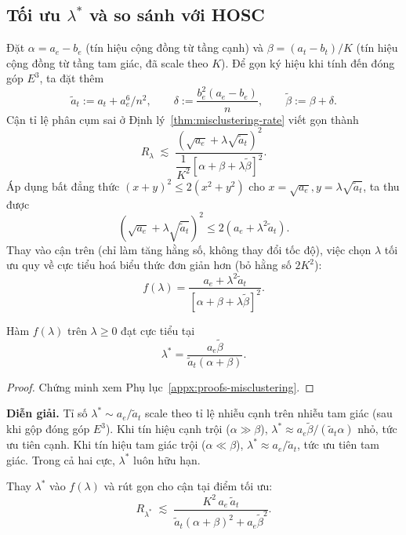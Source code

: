 \subsection{Tối ưu $\lambda^*$ và so sánh với HOSC}
\label{subsec:lambda-opt}

Đặt $\alpha = a_e - b_e$ (tín hiệu cộng đồng từ tầng cạnh) và $\beta = (a_t - b_t)/K$ (tín hiệu cộng đồng từ tầng tam giác, đã scale theo $K$). Để gọn ký hiệu khi tính đến đóng góp $E^3$, ta đặt thêm
\[
    \tilde a_t := a_t + a_e^6/n^2, \qquad \delta := \frac{b_e^2 (a_e - b_e)}{n}, \qquad \tilde\beta := \beta + \delta.
\]
Cận tỉ lệ phân cụm sai ở Định lý~\ref{thm:misclustering-rate} viết gọn thành
\[
    R_\lambda \;\lesssim\; \frac{(\sqrt{a_e} + \lambda \sqrt{\tilde a_t})^2}{\dfrac{1}{K^2}\left[\alpha + \beta + \lambda \tilde\beta\right]^2}.
\]
Áp dụng bất đẳng thức $(x + y)^2 \leq 2(x^2 + y^2)$ cho $x = \sqrt{a_e}, y = \lambda \sqrt{\tilde a_t}$, ta thu được
\[
    (\sqrt{a_e} + \lambda \sqrt{\tilde a_t})^2 \leq 2 (a_e + \lambda^2 \tilde a_t).
\]
Thay vào cận trên (chỉ làm tăng hằng số, không thay đổi tốc độ), việc chọn $\lambda$ tối ưu quy về cực tiểu hoá biểu thức đơn giản hơn (bỏ hằng số $2 K^2$):
\[
    f(\lambda) = \frac{a_e + \lambda^2 \tilde a_t}{\left[\alpha + \beta + \lambda \tilde\beta\right]^2}.
\]

\begin{proposition}
\label{prop:lambda-opt}
Hàm $f(\lambda)$ trên $\lambda \geq 0$ đạt cực tiểu tại
\[
    \lambda^* = \frac{a_e \tilde\beta}{\tilde a_t (\alpha + \beta)}.
\]
\end{proposition}

\begin{proof}
Chứng minh xem Phụ lục~\ref{appx:proofs-misclustering}.
\end{proof}

\textbf{Diễn giải.} Tỉ số $\lambda^* \sim a_e/\tilde a_t$ scale theo tỉ lệ nhiễu cạnh trên nhiễu tam giác (sau khi gộp đóng góp $E^3$). Khi tín hiệu cạnh trội ($\alpha \gg \beta$), $\lambda^* \approx a_e \tilde\beta / (\tilde a_t \alpha)$ nhỏ, tức ưu tiên cạnh. Khi tín hiệu tam giác trội ($\alpha \ll \beta$), $\lambda^* \approx a_e/\tilde a_t$, tức ưu tiên tam giác. Trong cả hai cực, $\lambda^*$ luôn hữu hạn.

Thay $\lambda^*$ vào $f(\lambda)$ và rút gọn cho cận tại điểm tối ưu:
\begin{equation}
    \label{eq:R-lambda-star}
    R_{\lambda^*} \;\lesssim\; \frac{K^2 \, a_e \, \tilde a_t}{\tilde a_t (\alpha + \beta)^2 + a_e \tilde\beta^2}.
\end{equation}

